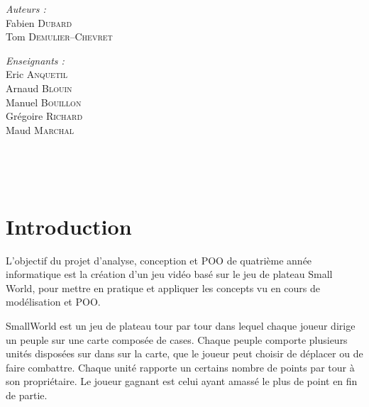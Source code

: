 \documentclass[a4paper]{article}%
\begin{document}
\begin{titlepage}
\begin{center}
\begin{minipage}{0.4\textwidth}
\begin{flushleft} \large
\emph{Auteurs :}\\
Fabien \textsc{Dubard}\\
Tom \textsc{Demulier--Chevret}\\
\end{flushleft}
\end{minipage}
\begin{minipage}{0.4\textwidth}
\begin{flushright} \large
\emph{Enseignants :} \\
Eric \textsc{Anquetil}\\
Arnaud \textsc{Blouin}\\
Manuel \textsc{Bouillon}\\
Grégoire \textsc{Richard}\\
Maud \textsc{Marchal}\\
\end{flushright}
\end{minipage}

\vfill


\end{center}
\end{titlepage}


\newpage

~
\newpage

\tableofcontents

\newpage
~
\newpage

\section*{Introduction}

L'objectif du projet d'analyse, conception et POO de quatrième année informatique est la création d'un jeu vidéo basé sur le jeu de plateau Small World, pour mettre en pratique et appliquer les concepts vu en cours de modélisation et POO.

\medskip

SmallWorld est un jeu de plateau tour par tour dans lequel chaque joueur dirige un peuple sur une carte composée de cases. Chaque peuple comporte plusieurs unités disposées sur dans sur la carte, que le joueur peut choisir de déplacer ou de faire combattre.
Chaque unité rapporte un certains nombre de points par tour à son propriétaire. 
Le joueur gagnant est celui ayant amassé le plus de point en fin de partie.
\end{document}
